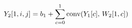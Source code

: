 \documentclass[preview]{standalone}
\begin{document}
\begin{align*}
\special{dvisvgm:raw <g id='unique000'>}Y_2[1,i,j]=b_1+\sum_{c=0}^{1}\text{conv}(Y_1[c],\,W_2[1,c])\special{dvisvgm:raw </g>}
\end{align*}
\end{document}
